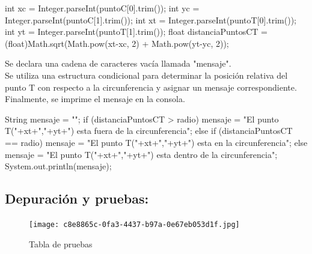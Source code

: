    \begin{javaCode}
        int xc = Integer.parseInt(puntoC[0].trim());
        int yc = Integer.parseInt(puntoC[1].trim());
        int xt = Integer.parseInt(puntoT[0].trim());
        int yt = Integer.parseInt(puntoT[1].trim());
        float distanciaPuntosCT = (float)Math.sqrt(Math.pow(xt-xc, 2) + Math.pow(yt-yc, 2));
    \end{javaCode}
    
    Se declara una cadena de caracteres vacía llamada "mensaje". \\
    Se utiliza una estructura condicional para determinar la posición relativa del punto T con respecto a la circunferencia y asignar un mensaje correspondiente. Finalmente, se imprime el mensaje en la consola.
    
    \begin{javaCode}
        String mensaje = "";
        if (distanciaPuntosCT > radio) {
            mensaje = "El punto T("+xt+","+yt+") esta fuera de la circunferencia";
        } else if (distanciaPuntosCT == radio) {
            mensaje = "El punto T("+xt+","+yt+") esta en la circunferencia";
        } else {
            mensaje = "El punto T("+xt+","+yt+") esta dentro de la circunferencia";
        }
        System.out.println(mensaje);
    \end{javaCode}
\subsection{\textbf{Depuración y pruebas:}}
\begin{figure}[h!]
    \centering
    \texttt{[image: c8e8865c-0fa3-4437-b97a-0e67eb053d1f.jpg]}
    \caption{Tabla de pruebas}
    \label{fig:enter-label}
\end{figure}